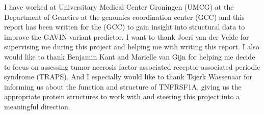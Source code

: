 I have worked at Universitary Medical Center Groningen (UMCG) at the Department of Genetics at the genomics coordination center (GCC) and this report has been written for the (GCC) to gain insight into structural data to improve the GAVIN variant predictor. I want to thank Joeri van der Velde for supervising me during this project and helping me with writing this report. I also would like to thank Benjamin Kant and Marielle van Gijn for helping me decide to focus on assessing tumor necrosis factor associated receptor-associated periodic syndrome (TRAPS). And I especially would like to thank Tsjerk Wassenaar for informing us about the function and structure of TNFRSF1A, giving us the appropriate protein structures to work with and steering this project into a meaningful direction.